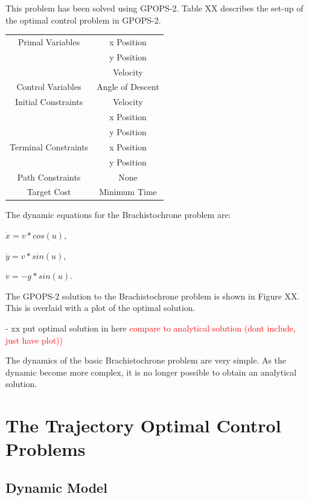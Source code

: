 This problem has been solved using GPOPS-2. Table XX describes the set-up of the optimal control problem in GPOPS-2. 
\begin{table}
\centering
\begin{tabular}{|c|c|}
	\hline Primal Variables  & x Position\\& y Position\\& Velocity\\ 
	\hline Control Variables  & Angle of Descent\\ 
	\hline Initial Constraints  & Velocity\\ & x Position\\ & y Position\\
	\hline Terminal Constraints &  x Position\\ & y Position\\
	\hline Path Constraints & None \\ 
	\hline Target Cost & Minimum Time \\ 
	\hline 
\end{tabular} 
\end{table}
The dynamic equations for the Brachistochrone problem are:

$\dot{x} = v*cos(u)$,

$\dot{y} = v*sin(u)$,

$\dot{v} = -g*sin(u)$.

The GPOPS-2 solution to the Brachistochrone problem is shown in Figure XX. This is overlaid with a plot of the optimal solution.

- xx put optimal solution in here 
\textcolor{red}{compare to analytical solution (dont include, just have plot))}


The dynamics of the basic Brachistochrone problem are very simple. As the dynamic become more complex, it is no longer possible to obtain an analytical solution. 

\section{The Trajectory Optimal Control Problems}

\subsection{Dynamic Model}


